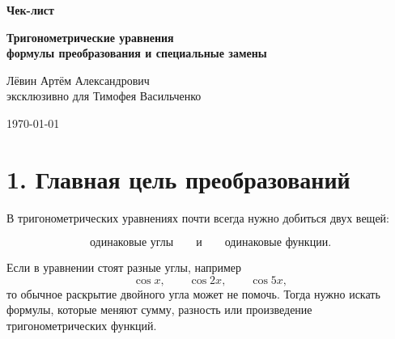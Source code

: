\documentclass[a4paper,12pt]{article}
\begin{document}
\begin{titlepage}
\thispagestyle{empty}
\begin{center}
\vspace*{28mm}

{\Large \textcolor{darkaccent}{\textbf{Чек-лист}}}

\vspace{6mm}

{\huge \textbf{Тригонометрические уравнения}}\\[2mm]
{\Large \textbf{формулы преобразования и специальные замены}}

\vspace{18mm}

{\large Лёвин Артём Александрович}\\[1mm]
{\large эксклюзивно для Тимофея Васильченко}

\vspace{12mm}

{\large \today}

\vfill


\vspace{12mm}
\end{center}
\end{titlepage}

\setcounter{page}{2}

\section*{\textcolor{darkaccent}{1. Главная цель преобразований}}

В тригонометрических уравнениях почти всегда нужно добиться двух вещей:

\[
\boxed{\text{одинаковые углы}}
\qquad\text{и}\qquad
\boxed{\text{одинаковые функции}}.
\]

Если в уравнении стоят разные углы, например
\[
\cos x,\qquad \cos 2x,\qquad \cos 5x,
\]
то обычное раскрытие двойного угла может не помочь. Тогда нужно искать формулы, которые меняют сумму, разность или произведение тригонометрических функций.
\end{document}
